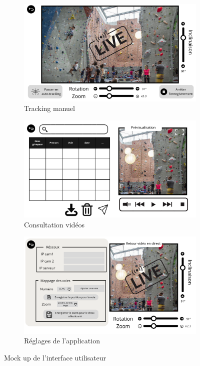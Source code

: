 \documentclass[a4paper, 11pt, french]{article}
\begin{document}
\begin{figure}[!ht]
  \begin{subfigure}[c]{.48\textwidth}
    \includegraphics[width=\textwidth]{Tracking manuel.png}
    \caption{Tracking manuel}
  \end{subfigure}
  \begin{subfigure}[c]{.48\textwidth}
    \includegraphics[width=\textwidth]{Consultation videos.png}
    \caption{Consultation vidéos}
  \end{subfigure}

  \begin{subfigure}[c]{.48\textwidth}
    \includegraphics[width=\textwidth]{Reglages.png}
    \caption{Réglages de l'application}
  \end{subfigure}
  \caption{Mock up de l'interface utilisateur}
  \label{fig:mockup}
\end{figure}
\end{document}
